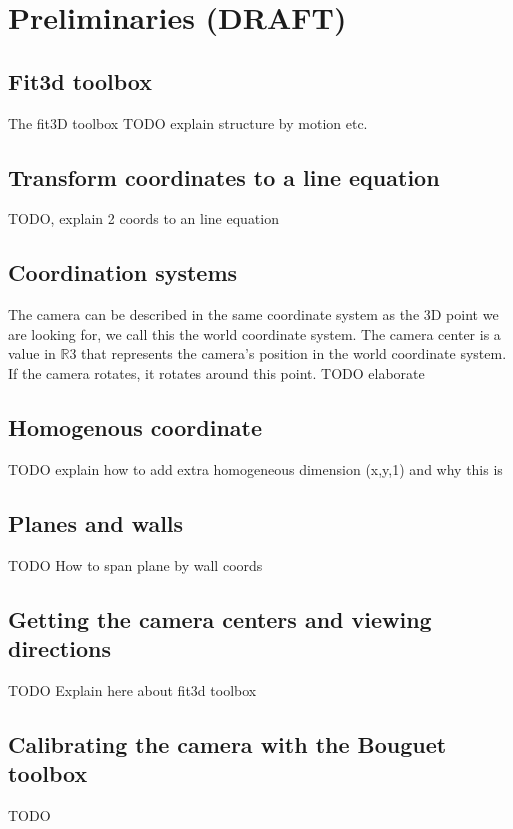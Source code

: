 \section{Preliminaries (DRAFT)}
\subsection{Fit3d toolbox}
The fit3D toolbox \cite{Fit3d} 
TODO explain structure by motion etc.

\subsection{Transform coordinates to a line equation}
\label{sec:lineeq}
TODO, explain 2 coords to an line equation


\subsection{Coordination systems}
The camera can be described in the same coordinate system as the 3D point we are
looking for, we call this the world coordinate system. 
The camera center is a value in $\mathbb{R}$3 that represents the camera's position in the world
coordinate system. If the camera rotates, it rotates around this point.
TODO elaborate\\

\subsection{Homogenous coordinate}
TODO explain how to add extra homogeneous dimension (x,y,1) and why this is


\subsection{Planes and walls}
\label{sec:planeswalls}
TODO How to span plane by wall coords

\subsection{Getting the camera centers and viewing directions}
\label{sec:cameracenters}
TODO Explain here about fit3d toolbox

\subsection{Calibrating the camera with the Bouguet toolbox}
\label{sec:bouguet}
TODO


